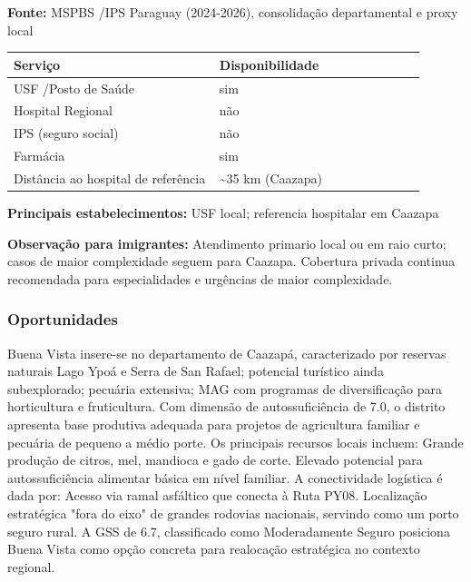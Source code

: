 \textbf{Fonte:} MSPBS /\allowbreak  IPS Paraguay (2024-2026), consolidação
departamental e proxy local

{\def\LTcaptype{none} %
\begin{longtable}{@{}>{\raggedright\arraybackslash}p{0.45\linewidth} >{\raggedright\arraybackslash}p{0.45\linewidth}@{}}
\toprule\noalign{}
Serviço & Disponibilidade \\
\midrule\noalign{}
\endhead
\bottomrule\noalign{}
\endlastfoot
USF /\allowbreak  Posto de Saúde & sim \\
Hospital Regional & não \\
IPS (seguro social) & não \\
Farmácia & sim \\
Distância ao hospital de referência & \textasciitilde35 km (Caazapa) \\
\end{longtable}
}

\textbf{Principais estabelecimentos:} USF local; referencia hospitalar
em Caazapa

\textbf{Observação para imigrantes:} Atendimento primario local ou em
raio curto; casos de maior complexidade seguem para Caazapa. Cobertura
privada continua recomendada para especialidades e urgências de maior
complexidade.
\newpage

\subsubsection*{Oportunidades}\label{oport-buena-vista-0603}
Buena Vista insere-se no departamento de Caazapá, caracterizado por reservas naturais Lago Ypoá e Serra de San Rafael; potencial turístico ainda subexplorado; pecuária extensiva; MAG com programas de diversificação para horticultura e fruticultura. Com dimensão de autossuficiência de 7.0, o distrito apresenta base produtiva adequada para projetos de agricultura familiar e pecuária de pequeno a médio porte. Os principais recursos locais incluem: Grande produção de citros, mel, mandioca e gado de corte. Elevado potencial para autossuficiência alimentar básica em nível familiar. A conectividade logística é dada por: Acesso via ramal asfáltico que conecta à Ruta PY08. Localização estratégica "fora do eixo" de grandes rodovias nacionais, servindo como um porto seguro rural. A GSS de 6.7, classificado como Moderadamente Seguro posiciona Buena Vista como opção concreta para realocação estratégica no contexto regional.

